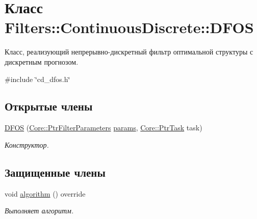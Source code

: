 \hypertarget{class_filters_1_1_continuous_discrete_1_1_d_f_o_s}{}\section{Класс Filters\+:\+:Continuous\+Discrete\+:\+:D\+F\+OS}
\label{class_filters_1_1_continuous_discrete_1_1_d_f_o_s}


Класс, реализующий непрерывно-\/дискретный фильтр оптимальной структуры с дискретным прогнозом.  




{\ttfamily \#include \char`\"{}cd\+\_\+dfos.\+h\char`\"{}}

\subsection*{Открытые члены}
\begin{DoxyCompactItemize}
\item 
\hyperlink{class_filters_1_1_continuous_discrete_1_1_d_f_o_s_a962505dc3f59ef8b68cb228b1cf481f1}{D\+F\+OS} (\hyperlink{namespace_core_a4811af8148ba137d644b9a61a042cf03}{Core\+::\+Ptr\+Filter\+Parameters} \hyperlink{class_core_1_1_filter_a44aa749b49ba46256975ce545531ecf7}{params}, \hyperlink{namespace_core_abfda8f69fcacfcea2696549b548ed737}{Core\+::\+Ptr\+Task} task)\hypertarget{class_filters_1_1_continuous_discrete_1_1_d_f_o_s_a962505dc3f59ef8b68cb228b1cf481f1}{}\label{class_filters_1_1_continuous_discrete_1_1_d_f_o_s_a962505dc3f59ef8b68cb228b1cf481f1}

\begin{DoxyCompactList}\small\item\em Конструктор. \end{DoxyCompactList}\end{DoxyCompactItemize}
\subsection*{Защищенные члены}
\begin{DoxyCompactItemize}
\item 
void \hyperlink{class_filters_1_1_continuous_discrete_1_1_d_f_o_s_a532847e55043544b0ea50fd5744939c1}{algorithm} () override
\begin{DoxyCompactList}\small\item\em Выполняет алгоритм. \end{DoxyCompactList}\end{DoxyCompactItemize}
